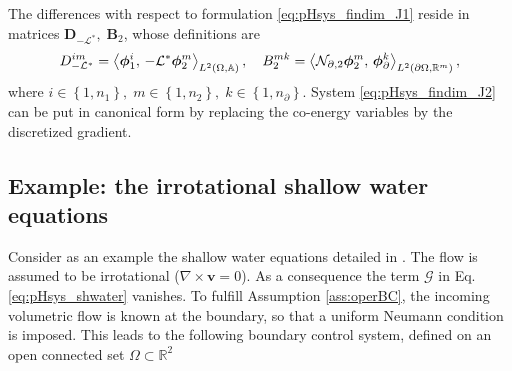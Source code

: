 The differences with respect to formulation \eqref{eq:pHsys_findim_J1} reside in matrices $\mathbf{D}_{-\mathcal{L}^*}, \; \mathbf{B}_2$, whose definitions are
\begin{equation}
{D}_{-\mathcal{L}^*}^{im} = \inner[L^2(\Omega, \mathbb{A})]{\bm\phi_1^i}{\mathcal{-L^*}\bm\phi_2^m}, \quad B_2^{mk} = \inner[L^2(\partial\Omega, \mathbb{R}^m)]{\mathcal{N}_{\partial, 2}\bm\phi_2^m}{\bm\phi_{\partial}^k},
\end{equation}
where $i \in \left\{1, n_1\right\}, \; m \in \left\{1, n_2\right\},\; k \in \left\{1, n_\partial \right\}$. System \eqref{eq:pHsys_findim_J2} can be put in canonical form by replacing the co-energy variables by the discretized gradient.

\subsection{Example: the irrotational shallow water equations}\label{sec:irrsw_discr}
Consider as an example the shallow water equations detailed in .  The flow is assumed to be irrotational ($\nabla \times \bm{v} = 0$). As a consequence the term $\bm{\mathcal{G}}$ in Eq. \eqref{eq:pHsys_shwater} vanishes.
To fulfill Assumption \ref{ass:operBC}, the incoming volumetric flow is known at the boundary, so that a uniform Neumann condition is imposed. This leads to the following boundary control system, defined on an open connected set $\Omega \subset \mathbb{R}^2$
